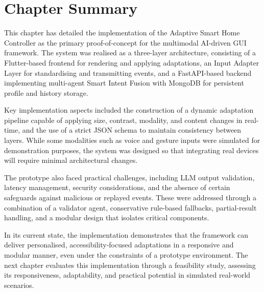 \section{Chapter Summary}
This chapter has detailed the implementation of the Adaptive Smart Home Controller as the primary proof-of-concept for the multimodal AI-driven GUI framework. The system was realised as a three-layer architecture, consisting of a Flutter-based frontend for rendering and applying adaptations, an Input Adapter Layer for standardising and transmitting events, and a FastAPI-based backend implementing multi-agent Smart Intent Fusion with MongoDB for persistent profile and history storage.

Key implementation aspects included the construction of a dynamic adaptation pipeline capable of applying size, contrast, modality, and content changes in real-time, and the use of a strict JSON schema to maintain consistency between layers. While some modalities such as voice and gesture inputs were simulated for demonstration purposes, the system was designed so that integrating real devices will require minimal architectural changes.

The prototype also faced practical challenges, including LLM output validation, latency management, security considerations, and the absence of certain safeguards against malicious or replayed events. These were addressed through a combination of a validator agent, conservative rule-based fallbacks, partial-result handling, and a modular design that isolates critical components.

In its current state, the implementation demonstrates that the framework can deliver personalised, accessibility-focused adaptations in a responsive and modular manner, even under the constraints of a prototype environment. The next chapter evaluates this implementation through a feasibility study, assessing its responsiveness, adaptability, and practical potential in simulated real-world scenarios.

